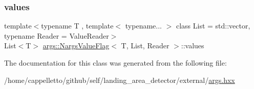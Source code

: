 \mbox{\label{classargs_1_1_nargs_value_flag_ab01fe7ab5b0979e15ce0d2d0896807db}} 
\subsubsection{\texorpdfstring{values}{values}}
{\footnotesize\ttfamily template$<$typename T , template$<$ typename... $>$ class List = std\+::vector, typename Reader  = Value\+Reader$>$ \\
List$<$T$>$ \hyperlink{classargs_1_1_nargs_value_flag}{args\+::\+Nargs\+Value\+Flag}$<$ T, List, Reader $>$\+::values\hspace{0.3cm}{\ttfamily [protected]}}



The documentation for this class was generated from the following file\+:\begin{DoxyCompactItemize}
\item 
/home/cappelletto/github/self/landing\+\_\+area\+\_\+detector/external/\hyperlink{args_8hxx}{args.\+hxx}\end{DoxyCompactItemize}
